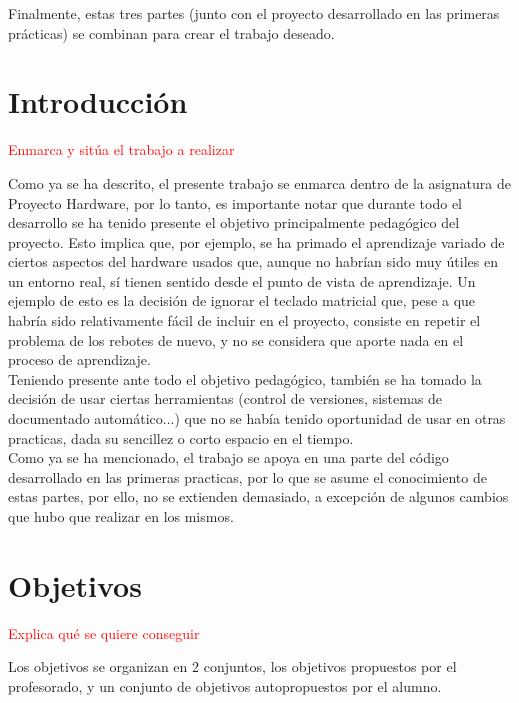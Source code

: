 \documentclass[12pt,letterpaper]{article}
\begin{document}
Finalmente, estas tres partes (junto con el proyecto desarrollado en
las primeras prácticas) se combinan para crear el trabajo deseado.

\section{Introducción}
\label{sec:introduccion}
\textcolor{red}{Enmarca y sitúa el trabajo a realizar}

Como ya se ha descrito, el presente trabajo se enmarca dentro de la
asignatura de Proyecto Hardware, por lo tanto, es importante notar que
durante todo el desarrollo se ha tenido presente el objetivo
principalmente pedagógico del proyecto. Esto implica que, por ejemplo,
se ha primado el aprendizaje variado de ciertos aspectos del hardware
usados que, aunque no habrían sido muy útiles en un entorno real, sí
tienen sentido desde el punto de vista de aprendizaje. Un ejemplo de
esto es la decisión de ignorar el teclado matricial que, pese a que
habría sido relativamente fácil de incluir en el proyecto, consiste en
repetir el problema de los rebotes de nuevo, y no se considera que
aporte nada en el proceso de aprendizaje.\\

Teniendo presente ante todo el objetivo pedagógico, también se ha
tomado la decisión de usar ciertas herramientas (control de versiones,
sistemas de documentado automático...) que no se había tenido
oportunidad de usar en otras practicas, dada su sencillez o corto
espacio en el tiempo.\\

Como ya se ha mencionado, el trabajo se apoya en una parte del código
desarrollado en las primeras practicas, por lo que se asume el
conocimiento de estas partes, por ello, no se extienden demasiado, a
excepción de algunos cambios que hubo que realizar en los mismos.

\section{Objetivos}
\label{sec:objetivos}
\textcolor{red}{
  Explica qué se quiere conseguir
}

Los objetivos se organizan en 2 conjuntos, los objetivos propuestos
por el profesorado, y un conjunto de objetivos autopropuestos por el
alumno.
\end{document}
